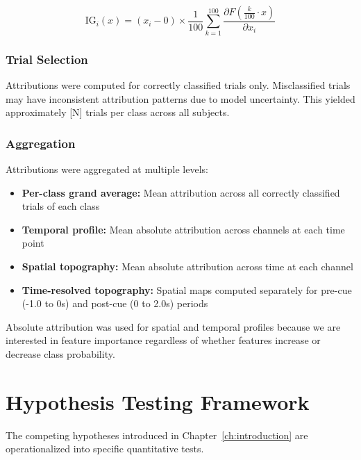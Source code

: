 \begin{equation}
    \text{IG}_i(x) = (x_i - 0) \times \frac{1}{100} \sum_{k=1}^{100} \frac{\partial F\left(\frac{k}{100} \cdot x\right)}{\partial x_i}
\end{equation}

\subsubsection{Trial Selection}

Attributions were computed for correctly classified trials only. Misclassified trials may have inconsistent attribution patterns due to model uncertainty. This yielded approximately [N] trials per class across all subjects.

\subsubsection{Aggregation}

Attributions were aggregated at multiple levels:

\begin{itemize}
    \item \textbf{Per-class grand average:} Mean attribution across all correctly classified trials of each class
    \item \textbf{Temporal profile:} Mean absolute attribution across channels at each time point
    \item \textbf{Spatial topography:} Mean absolute attribution across time at each channel
    \item \textbf{Time-resolved topography:} Spatial maps computed separately for pre-cue (-1.0 to 0s) and post-cue (0 to 2.0s) periods
\end{itemize}

Absolute attribution was used for spatial and temporal profiles because we are interested in feature importance regardless of whether features increase or decrease class probability.


\section{Hypothesis Testing Framework}
\label{sec:methods_hypothesis}

The competing hypotheses introduced in Chapter~\ref{ch:introduction} are operationalized into specific quantitative tests.


